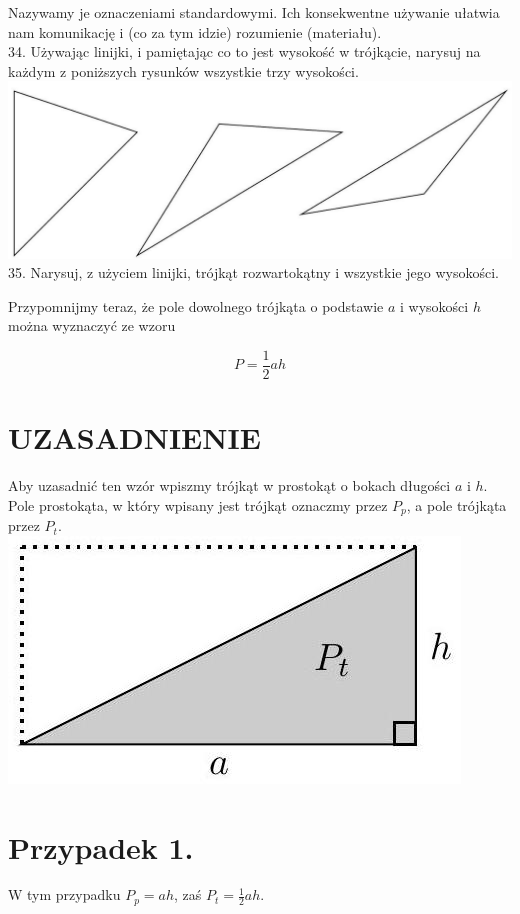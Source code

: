 \documentclass[10pt]{article}
\begin{document}
Nazywamy je oznaczeniami standardowymi. Ich konsekwentne używanie ułatwia nam komunikację i (co za tym idzie) rozumienie (materiału).\\
34. Używając linijki, i pamiętając co to jest wysokość w trójkącie, narysuj na każdym z poniższych rysunków wszystkie trzy wysokości.\\
\includegraphics[max width=\textwidth, center]{2024_11_21_8f01584889ff06348ae7g-196(2)}\\
35. Narysuj, z użyciem linijki, trójkąt rozwartokątny i wszystkie jego wysokości.

Przypomnijmy teraz, że pole dowolnego trójkąta o podstawie \(a\) i wysokości \(h\) można wyznaczyć ze wzoru

\[
P=\frac{1}{2} a h
\]

\section*{UZASADNIENIE}
Aby uzasadnić ten wzór wpiszmy trójkąt w prostokąt o bokach długości \(a\) i \(h\). Pole prostokąta, w który wpisany jest trójkąt oznaczmy przez \(P_{p}\), a pole trójkąta przez \(P_{t}\).\\
\includegraphics[max width=\textwidth, center]{2024_11_21_8f01584889ff06348ae7g-197}

\section*{Przypadek 1.}
W tym przypadku \(P_{p}=a h\), zaś \(P_{t}=\frac{1}{2} a h\).
\end{document}

